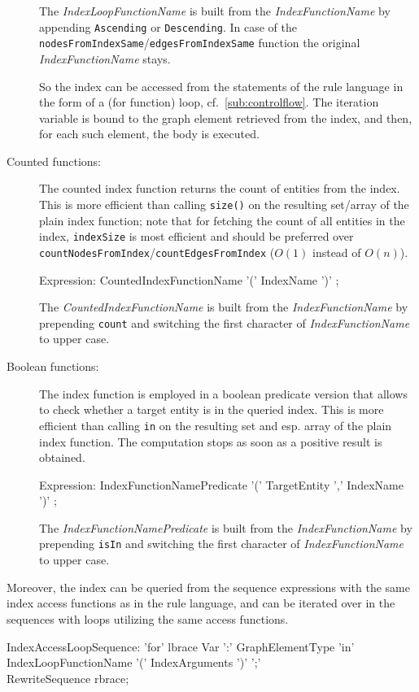 \begin{description}
The \emph{IndexLoopFunctionName} is built from the \emph{IndexFunctionName} by appending \texttt{Ascending} or \texttt{Descending}.
In case of the \texttt{nodesFromIndexSame}/\texttt{edgesFromIndexSame} function the original \emph{IndexFunctionName} stays.

So the index can be accessed from the statements of the rule language in the form of a (for function) loop, cf.~\ref{sub:controlflow}.
The iteration variable is bound to the graph element retrieved from the index, and then, for each such element, the body is executed.

	\item[Counted functions:] The counted index function returns the count of entities from the index. This is more efficient than calling \texttt{size()} on the resulting set/array of the plain index function; note that for fetching the count of all entities in the index, \texttt{indexSize} is most efficient and should be preferred over \texttt{countNodesFromIndex}/\texttt{countEdgesFromIndex} ($O(1)$ instead of $O(n)$).
\begin{rail}
Expression:
  CountedIndexFunctionName '(' IndexName ')' ;
\end{rail}
The \emph{CountedIndexFunctionName} is built from the \emph{IndexFunctionName} by prepending \texttt{count} and switching the first character of \emph{IndexFunctionName} to upper case.

	\item[Boolean functions:] The index function is employed in a boolean predicate version that allows to check whether a target entity is in the queried index. This is more efficient than calling \texttt{in} on the resulting set and esp. array of the plain index function. The computation stops as soon as a positive result is obtained.
\begin{rail}
Expression:
  IndexFunctionNamePredicate '(' TargetEntity ',' IndexName ')' ;
\end{rail}
The \emph{IndexFunctionNamePredicate} is built from the \emph{IndexFunctionName} by prepending \texttt{isIn} and switching the first character of \emph{IndexFunctionName} to upper case.
\end{description}

Moreover, the index can be queried from the sequence expressions with the same index access functions as in the rule language, and can be iterated over in the sequences with loops utilizing the same access functions.

\begin{rail}
  IndexAccessLoopSequence:
    'for' lbrace Var ':' GraphElementType 'in' \\ IndexLoopFunctionName '(' IndexArguments ')' ';' \\ RewriteSequence rbrace;
\end{rail}


